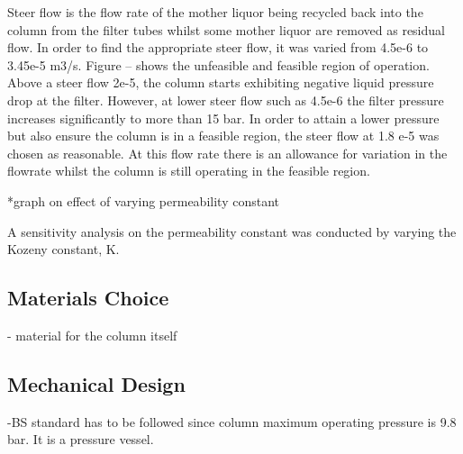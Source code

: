Steer flow is the flow rate of the mother liquor being recycled back into the column from the filter tubes whilst some mother liquor are removed as residual flow. In order to find the appropriate steer flow, it was varied from 4.5e-6 to 3.45e-5 m3/s. Figure -- shows the unfeasible and feasible region of operation. Above a steer flow 2e-5, the column starts exhibiting negative liquid pressure drop at the filter. However, at lower steer flow such as 4.5e-6 the filter pressure increases significantly to more than 15 bar. In order to attain a lower pressure but also ensure the column is in a feasible region, the steer flow at 1.8 e-5 was chosen as reasonable. At this flow rate there is an allowance for variation in the flowrate whilst the column is still operating in the feasible region. 

*graph on effect of varying permeability constant

A sensitivity analysis on the permeability constant was conducted by varying the Kozeny constant, K. 


\subsection{Materials Choice}
- material for the column itself 

\subsection{Mechanical Design}
-BS standard has to be followed since column maximum operating pressure is 9.8 bar. It is a pressure vessel.  
